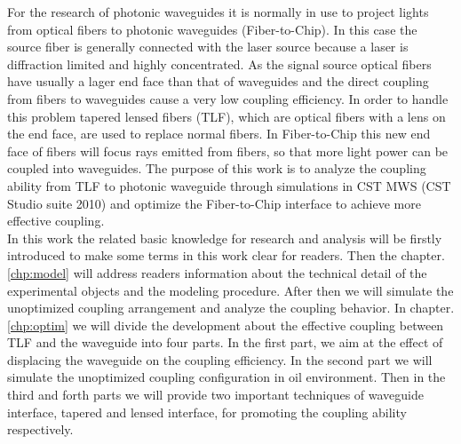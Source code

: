 
For the research of photonic waveguides it is normally in use to project lights from optical fibers to photonic waveguides (Fiber-to-Chip). In this case the source fiber is generally connected with the laser source because a laser is diffraction limited and highly concentrated. As the signal source optical fibers have usually a lager end face than that of waveguides and the direct coupling from fibers to waveguides cause a very low coupling efficiency. In order to handle this problem tapered lensed fibers (TLF), which are optical fibers with a lens on the end face, are used to replace normal fibers. In Fiber-to-Chip  this new end face of fibers will focus rays emitted from fibers, so that more light power can be coupled into waveguides. The purpose of this work is to analyze the coupling ability from TLF to photonic waveguide through simulations in CST MWS  (CST Studio suite 2010) and optimize the Fiber-to-Chip interface to achieve more effective coupling.\\

In this work the related basic knowledge for research and analysis will be firstly introduced to make some terms in this work clear for readers. Then the chapter. \ref{chp:model} will address readers information about the technical detail of the experimental objects and the modeling procedure. After then we will simulate the unoptimized coupling arrangement and analyze the coupling behavior. In chapter. \ref{chp:optim} we will divide the development about the effective coupling between TLF and the waveguide  into four parts. In the first part, we aim at the effect of displacing the waveguide on the coupling efficiency. In the second part we will simulate the unoptimized coupling configuration in oil environment. Then in the third and forth parts we will provide two important techniques of waveguide interface, tapered and lensed interface, for promoting the coupling ability respectively.\\  
